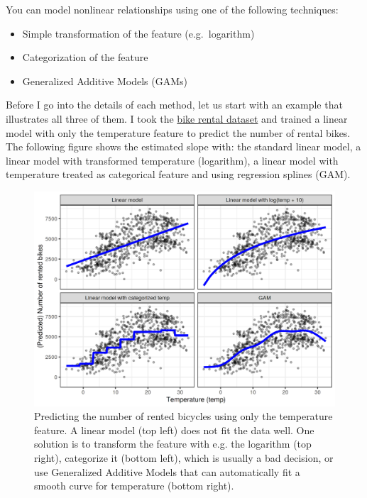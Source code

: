 \documentclass[12pt,]{krantz}
\providecommand{\tightlist}{%
  \setlength{\itemsep}{0pt}\setlength{\parskip}{0pt}}
\begin{document}
You can model nonlinear relationships using one of the following
techniques:

\begin{itemize}
\tightlist
\item
  Simple transformation of the feature (e.g.~logarithm)
\item
  Categorization of the feature
\item
  Generalized Additive Models (GAMs)
\end{itemize}

Before I go into the details of each method, let us start with an
example that illustrates all three of them. I took the
\protect\hyperlink{bike-data}{bike rental dataset} and trained a linear
model with only the temperature feature to predict the number of rental
bikes. The following figure shows the estimated slope with: the standard
linear model, a linear model with transformed temperature (logarithm), a
linear model with temperature treated as categorical feature and using
regression splines (GAM).

\begin{figure}

{\centering \includegraphics[width=\textwidth]{images/nonlinear-effects-1} 

}

\caption{Predicting the number of rented bicycles using only the temperature feature. A linear model (top left) does not fit the data well. One solution is to transform the feature with e.g. the logarithm (top right), categorize it (bottom left), which is usually a bad decision, or use Generalized Additive Models that can automatically fit a smooth curve for temperature (bottom right).}\label{fig:nonlinear-effects}
\end{figure}
\end{document}
